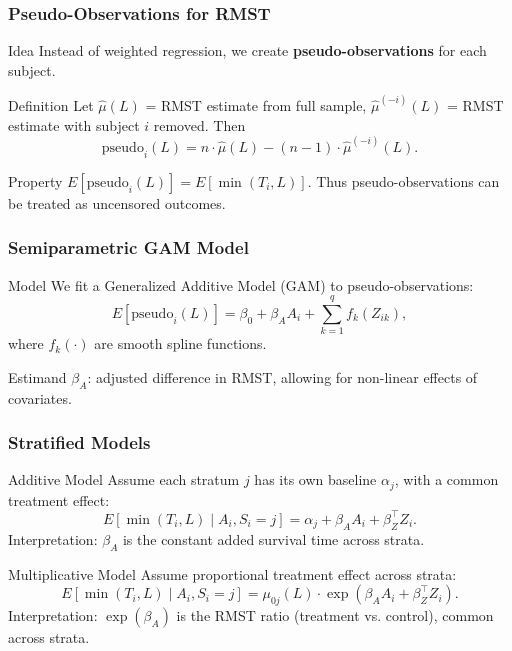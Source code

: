 \documentclass{beamer}
\begin{document}
\begin{frame}
\frametitle{Pseudo-Observations for RMST}

\begin{block}{Idea}
Instead of weighted regression, we create \textbf{pseudo-observations} for each subject.
\end{block}

\begin{block}{Definition}
Let $\widehat{\mu}(L)$ = RMST estimate from full sample,  
$\widehat{\mu}^{(-i)}(L)$ = RMST estimate with subject $i$ removed.  
Then
\[
\text{pseudo}_i(L) = n \cdot \widehat{\mu}(L) - (n-1)\cdot \widehat{\mu}^{(-i)}(L).
\]
\end{block}

\begin{block}{Property}
$E[\text{pseudo}_i(L)] = E[\min(T_i,L)]$.  
Thus pseudo-observations can be treated as uncensored outcomes.
\end{block}

\end{frame}

\begin{frame}
\frametitle{Semiparametric GAM Model}

\begin{block}{Model}
We fit a Generalized Additive Model (GAM) to pseudo-observations:
\[
E[\text{pseudo}_i(L)] = \beta_0 + \beta_A A_i + \sum_{k=1}^q f_k(Z_{ik}),
\]
where $f_k(\cdot)$ are smooth spline functions.
\end{block}

\begin{block}{Estimand}
$\beta_A$: adjusted difference in RMST,  
allowing for non-linear effects of covariates.
\end{block}

\end{frame}

\begin{frame}
\frametitle{Stratified Models}

\begin{block}{Additive Model}
Assume each stratum $j$ has its own baseline $\alpha_j$, with a common treatment effect:
\[
E[\min(T_i,L) \mid A_i, S_i=j] = \alpha_j + \beta_A A_i + \beta_Z^\top Z_i.
\]
Interpretation: $\beta_A$ is the constant added survival time across strata.
\end{block}

\begin{block}{Multiplicative Model}
Assume proportional treatment effect across strata:
\[
E[\min(T_i,L) \mid A_i, S_i=j] = \mu_{0j}(L) \cdot \exp(\beta_A A_i + \beta_Z^\top Z_i).
\]
Interpretation: $\exp(\beta_A)$ is the RMST ratio (treatment vs. control), common across strata.
\end{block}

\end{frame}
\end{document}
